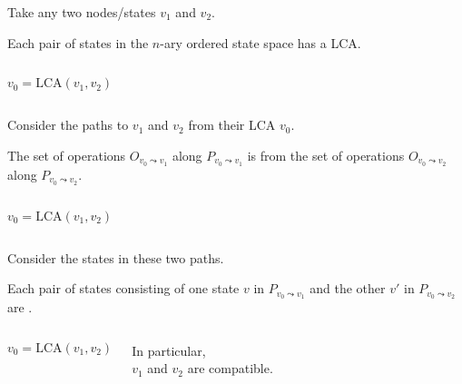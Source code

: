 \begin{frame}{}
  \centerline{ Take any two nodes/states $v_1$ and $v_2$.}

  \begin{lemma}
    Each pair of states in the $n$-ary ordered state space has a  LCA.
  \end{lemma}

  \begin{columns}
	\[
	  v_0 = \text{LCA}(v_1, v_2)
	\]
  \end{columns}
\end{frame}

\begin{frame}{}
  \centerline{ Consider the paths to $v_1$ and $v_2$ from their LCA $v_0$.}

  \begin{lemma}
    The set of operations $O_{v_0 \leadsto v_1}$ along $P_{v_0 \leadsto v_1}$ 
    is  from the set of operations $O_{v_0 \leadsto v_2}$ along $P_{v_0 \leadsto v_2}$.
  \end{lemma}

  \begin{columns}
	\[
	  v_0 = \text{LCA}(v_1, v_2)
	\]
  \end{columns}
\end{frame}

\begin{frame}{}
  \centerline{ Consider the states in these two paths.}

  \begin{lemma}
    Each pair of states consisting of one state $v$ in $P_{v_0 \leadsto v_1}$ and the other $v'$ in $P_{v_0 \leadsto v_2}$ are .
  \end{lemma}

  \begin{columns}
	\[
	  v_0 = \text{LCA}(v_1, v_2)
	\]

	\vspace{0.50cm}
	\begin{center}
	  {In particular, \\ $v_1$ and $v_2$ are compatible.}
	\end{center}
  \end{columns}
\end{frame}

